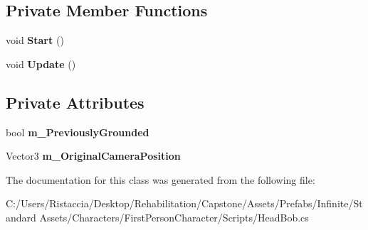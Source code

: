 \subsection*{Private Member Functions}
\begin{DoxyCompactItemize}
\item 
\mbox{\label{class_unity_standard_assets_1_1_characters_1_1_first_person_1_1_head_bob_a247c2eec72fbdbddfc8b25f3952c129b}} 
void {\bfseries Start} ()
\item 
\mbox{\label{class_unity_standard_assets_1_1_characters_1_1_first_person_1_1_head_bob_ab349c46e7ead58a38dd370703c903245}} 
void {\bfseries Update} ()
\end{DoxyCompactItemize}
\subsection*{Private Attributes}
\begin{DoxyCompactItemize}
\item 
\mbox{\label{class_unity_standard_assets_1_1_characters_1_1_first_person_1_1_head_bob_ad52bb8df3f7932de44de8d29a6374ed3}} 
bool {\bfseries m\+\_\+\+Previously\+Grounded}
\item 
\mbox{\label{class_unity_standard_assets_1_1_characters_1_1_first_person_1_1_head_bob_a4e7d02d902ceaccc67e278ba5e50d980}} 
Vector3 {\bfseries m\+\_\+\+Original\+Camera\+Position}
\end{DoxyCompactItemize}


The documentation for this class was generated from the following file\+:\begin{DoxyCompactItemize}
\item 
C\+:/\+Users/\+Ristaccia/\+Desktop/\+Rehabilitation/\+Capstone/\+Assets/\+Prefabs/\+Infinite/\+Standard Assets/\+Characters/\+First\+Person\+Character/\+Scripts/Head\+Bob.\+cs\end{DoxyCompactItemize}
